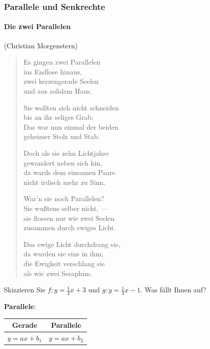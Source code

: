 
\subsubsection{Parallele und Senkrechte}

\paragraph{Die zwei Parallelen} (Christian Morgenstern)
\begin{verse}
Es gingen zwei Parallelen\\
ins Endlose hinaus,\\
zwei kerzengerade Seelen\\
und aus solidem Haus.

Sie wollten sich nicht schneiden\\
bis an ihr seliges Grab:\\
Das war nun einmal der beiden\\
geheimer Stolz und Stab.

Doch als sie zehn Lichtjahre\\
gewandert neben sich hin,\\
da wards dem einsamen Paare\\
nicht irdisch mehr zu Sinn.

War'n sie noch Parallelen?\\
Sie wußtens selber nicht, ---\\
sie flossen nur wie zwei Seelen\\
zusammen durch ewiges Licht.

Das ewige Licht durchdrang sie,\\
da wurden sie eins in ihm;\\
die Ewigkeit verschlang sie\\
als wie zwei Seraphim.
\end{verse}
\newpage


Skizzieren Sie $f: y=\frac{1}{4}x +3$ und $g:
y=\frac{1}{4}x -1$. Was fällt Ihnen auf?



\textbf{Parallele}:\\

\begin{center}
\begin{tabular}{c|c}
  Gerade     & Parallele   \\
  \hline
  $y=ax+b_1$ & $y=ax+b_2$ \\
\end{tabular}
\end{center}

